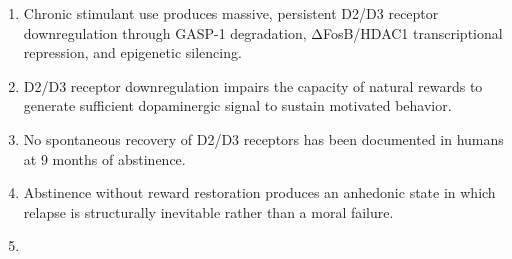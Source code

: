 \begin{enumerate}
\def\labelenumi{\arabic{enumi}.}
\tightlist
\item
  Chronic stimulant use produces massive, persistent D2/D3 receptor downregulation through GASP-1 degradation, ΔFosB/HDAC1 transcriptional repression, and epigenetic silencing.\\
\item
  D2/D3 receptor downregulation impairs the capacity of natural rewards to generate sufficient dopaminergic signal to sustain motivated behavior.\\
\item
  No spontaneous recovery of D2/D3 receptors has been documented in humans at 9 months of abstinence.\\
\item
  Abstinence without reward restoration produces an anhedonic state in which relapse is structurally inevitable rather than a moral failure.\\
\item

\end{enumerate}
